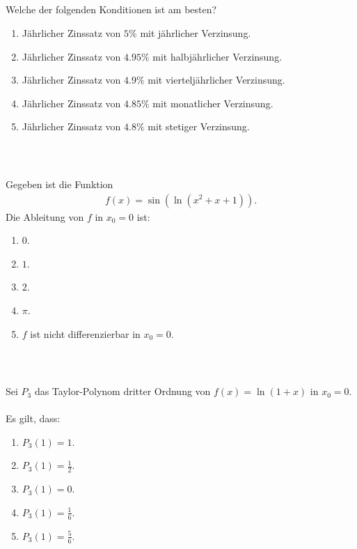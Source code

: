 \subsection*{}
Welche der folgenden Konditionen ist am besten?
\renewcommand{\labelenumi}{(\alph{enumi})}
\begin{enumerate}
	\item 
	Jährlicher Zinssatz von $5 \%$ mit jährlicher Verzinsung.
	\item
	Jährlicher Zinssatz von $4.95 \%$ mit halbjährlicher Verzinsung.
	\item
	Jährlicher Zinssatz von $4.9 \%$ mit vierteljährlicher Verzinsung.
	\item
	Jährlicher Zinssatz von $4.85 \%$ mit monatlicher Verzinsung.
	\item
	Jährlicher Zinssatz von $4.8 \%$ mit stetiger Verzinsung.	
\end{enumerate}
\ \\
\subsection*{}
Gegeben ist die Funktion
\begin{align*}
	f(x) = \sin(\ln(x^2 + x + 1)).
\end{align*}
Die Ableitung von $f$ in $x_0 = 0 $ ist:
\renewcommand{\labelenumi}{(\alph{enumi})}
\begin{enumerate}
	\item 
	$ 0$.
	\item
	$ 1 $.
	\item
	$ 2 $.
	\item
	$ \pi $.
	\item
	$f$ ist nicht differenzierbar in $x_0 = 0$.
\end{enumerate}
\ \\
\subsection*{}
Sei $P_3$ das Taylor-Polynom dritter Ordnung von $f(x) = \ln(1+ x) $ in $x_0 = 0$.\\
\\
Es gilt, dass:
\renewcommand{\labelenumi}{(\alph{enumi})}
\begin{enumerate}
\item 
$P_3(1) = 1 $.
\item 
$P_3(1) = \frac{1 }{2}$.
\item
$P_3(1) =  0$.
\item
$P_3(1) = \frac{1 }{6}$.
\item
$P_3(1) = \frac{5 }{6}$.
\end{enumerate}
\ 
